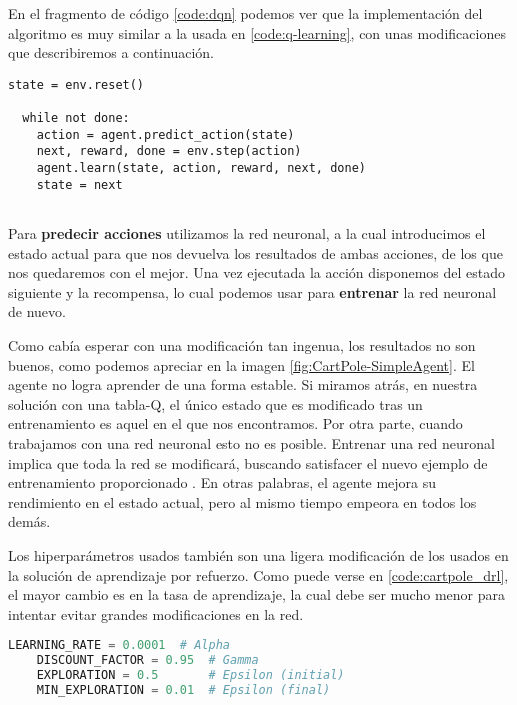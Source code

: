 En el fragmento de código \ref{code:dqn} podemos ver que la implementación del algoritmo es muy similar a la usada en \ref{code:q-learning}, con unas modificaciones que describiremos a continuación.

\begin{minipage}{0.9\linewidth}%
\begin{lstlisting}[frame=tb, caption=Pseudocódigo SimpleAgent, inputencoding=latin1, label=code:dqn]      
  state = env.reset()

  while not done:
    action = agent.predict_action(state)
    next, reward, done = env.step(action)
    agent.learn(state, action, reward, next, done)
    state = next
        
\end{lstlisting}%
\end{minipage}

Para \textbf{predecir acciones} utilizamos la red neuronal, a la cual introducimos el estado actual para que nos devuelva los resultados de ambas acciones, de los que nos quedaremos con el mejor. Una vez ejecutada la acción disponemos del estado siguiente y la recompensa, lo cual podemos usar para \textbf{entrenar} la red neuronal de nuevo.

Como cabía esperar con una modificación tan ingenua, los resultados no son buenos, como podemos apreciar en la imagen \ref{fig:CartPole-SimpleAgent}. El agente no logra aprender de una forma estable. Si miramos atrás, en nuestra solución con una tabla-Q, el único estado que es modificado tras un entrenamiento es aquel en el que nos encontramos. Por otra parte, cuando trabajamos con una red neuronal esto no es posible. Entrenar una red neuronal implica que toda la red se modificará, buscando satisfacer el nuevo ejemplo de entrenamiento proporcionado \citep[cap. 2]{Buduma:general}. En otras palabras, el agente mejora su rendimiento en el estado actual, pero al mismo tiempo empeora en todos los demás.

Los hiperparámetros usados también son una ligera modificación de los usados en la solución de aprendizaje por refuerzo. Como puede verse en \ref{code:cartpole_drl}, el mayor cambio es en la tasa de aprendizaje, la cual debe ser mucho menor para intentar evitar grandes modificaciones en la red.

\begin{minipage}{0.9\linewidth}%
    \begin{lstlisting}[frame=tb, language=Python, caption=Hiperparámetros, label=code:cartpole_drl]
    LEARNING_RATE = 0.0001  # Alpha
    DISCOUNT_FACTOR = 0.95  # Gamma
    EXPLORATION = 0.5       # Epsilon (initial)
    MIN_EXPLORATION = 0.01  # Epsilon (final)
    \end{lstlisting}%
\end{minipage}

